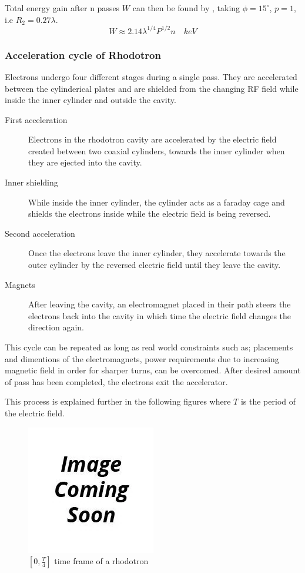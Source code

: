 \documentclass[a4paper,oneside,12pt]{report}
\numberwithin{equation}{chapter}
\begin{document}
Total energy gain after n passes $W$ can then be found by , taking $\phi = 15^\circ$, $p=1$, i.e $R_2 = 0.27 \lambda$.
\begin{equation}
    \label{eq:W_total_gain_pottier}
    W \approx 2.14 \lambda^{1/4} P^{1/2} n \quad keV
\end{equation}

\subsubsection{Acceleration cycle of Rhodotron}

Electrons undergo four different stages during a single pass. 
They are accelerated between the cylinderical plates and are shielded from the changing RF field while inside the inner cylinder and outside the cavity. 

\begin{description}
    \item[First acceleration] Electrons in the rhodotron cavity are accelerated by the electric field created between two coaxial cylinders, towards the inner cylinder when they are ejected into the cavity.
    \item[Inner shielding] While inside the inner cylinder, the cylinder acts as a faraday cage and shields the electrons inside while the electric field is being reversed.
    \item[Second acceleration] Once the electrons leave the inner cylinder, they accelerate towards the outer cylinder by the reversed electric field until they leave the cavity.
    \item[Magnets] After leaving the cavity, an electromagnet placed in their path steers the electrons back into the cavity in which time the electric field changes the direction again.
\end{description}

This cycle can be repeated as long as real world constraints such as; placements and dimentions of the electromagnets, power requirements due to increasing magnetic field in order for sharper turns, can be overcomed.
After desired amount of pass has been completed, the electrons exit the accelerator.

This process is explained further in the following figures where $T$ is the period of the electric field.
\begin{figure}[H]
    \centering
    \includegraphics[scale=0.75]{./figures/to_be_added.png}
    \caption{$[0, \frac{T}{4}]$ time frame of a rhodotron}
\end{figure}
\end{document}

